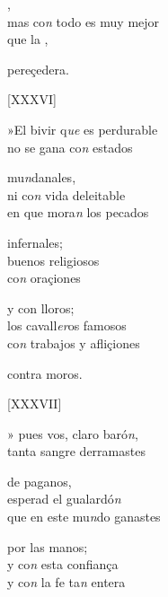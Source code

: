 \documentclass[11pt,a4paper,twoside]{article}
\begin{document}
{ ,\\
mas co\textit{n} todo es muy mejor\\
que la  ,                                                                            

pereçedera.
\pend

\begin{center}
	[XXXVI]
\end{center}
\pstart
»El bivir q\textit{ue} es perdurable\\
no se gana co\textit{n} estados 

mu\textit{n}danales,\\
ni co\textit{n} vida deleitable\\
en que mora\textit{n} los pecados

infernales;\\
 buenos religiosos\\
 co\textit{n} oraçiones                                                                         

y con lloros;\\
los cavall\textit{er}os famosos\\
co\textit{n} trabajos y afliçiones 

contra moros. 
\pend

\begin{center}
	[XXXVII]
\end{center}
\pstart
» pues vos, claro baró\textit{n},\\
tanta sangre derramastes                                                                      

de paganos,\\
esperad el gualardó\textit{n}\\
que en este mu\textit{n}do ganastes 

por las manos;\\
y co\textit{n} esta confiança\\
y co\textit{n} la fe ta\textit{n} entera 

}
\end{document}

